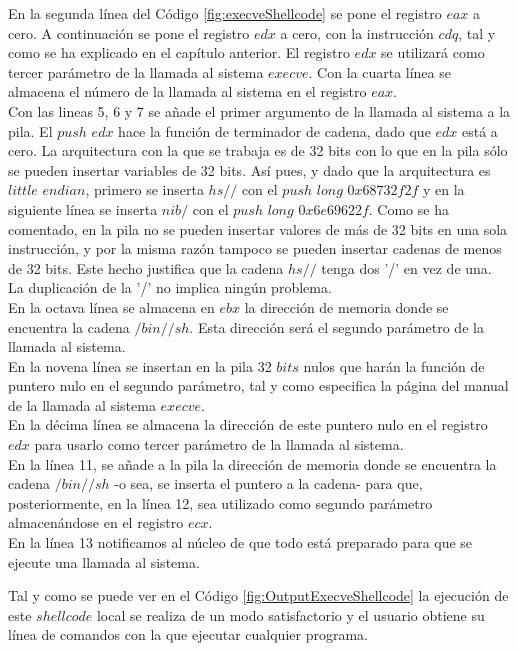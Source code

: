 \documentclass [titlepage, 12pt]{article}
\begin{document}
En la segunda l\'inea del C\'odigo \ref{fig:execveShellcode} se pone el registro $eax$ a cero. A continuaci\'on se pone el registro $edx$ a cero, con la instrucci\'on $cdq$, tal y como se ha explicado en el cap\'itulo anterior. El registro $edx$ se utilizar\'a como tercer par\'ametro de la llamada al sistema $execve$. Con la cuarta l\'inea se almacena el n\'umero de la llamada al sistema en el registro $eax$.\\
Con las lineas 5, 6 y 7 se a\~nade el primer argumento de la llamada al sistema a la pila. El $push$ $edx$ hace la funci\'on de terminador de cadena, dado que $edx$ est\'a a cero. La arquitectura con la que se trabaja es de 32 bits con lo que en la pila s\'olo se pueden insertar variables de 32 bits. As\'i pues, y dado que la arquitectura es $little$ $endian$, primero se inserta $hs//$ con el $push$ $long$ $0x68732f2f$ y en la siguiente l\'inea se inserta $nib/$ con el $push$ $long$ $0x6e69622f$. Como se ha comentado, en la pila no se pueden insertar valores de m\'as de 32 bits en una sola instrucci\'on, y por la misma raz\'on tampoco se pueden insertar cadenas de menos de 32 bits. Este hecho justifica que la cadena $hs//$ tenga dos '/' en vez de una. La duplicaci\'on de la '/' no implica ning\'un problema. \\
En la octava l\'inea se almacena en $ebx$ la direcci\'on de memoria donde se encuentra la cadena $/bin//sh$. Esta direcci\'on ser\'a el segundo par\'ametro de la llamada al sistema.\\
En la novena l\'inea se insertan en la pila 32 $bits$ nulos que har\'an la funci\'on de puntero nulo en el segundo par\'ametro, tal y como especifica la p\'agina del manual de la llamada al sistema $execve$. \\
En la d\'ecima l\'inea se almacena la direcci\'on de este puntero nulo en el registro $edx$ para usarlo como tercer par\'ametro de la llamada al sistema. \\
En la l\'inea 11, se a\~nade a la pila la direcci\'on de memoria donde se encuentra la cadena $/bin//sh$ -o sea, se inserta el puntero a la cadena- para que, posteriormente, en la l\'inea 12, sea utilizado como segundo par\'ametro almacen\'andose en el registro $ecx$.\\
En la l\'inea 13 notificamos al n\'ucleo de que todo est\'a preparado para que se ejecute una llamada al sistema.\bigskip

Tal y como se puede ver en el C\'odigo \ref{fig:OutputExecveShellcode} la ejecuci\'on de este $shellcode$ local se realiza de un modo satisfactorio y el usuario obtiene su l\'inea de comandos con la que ejecutar cualquier programa.
\end{document}
